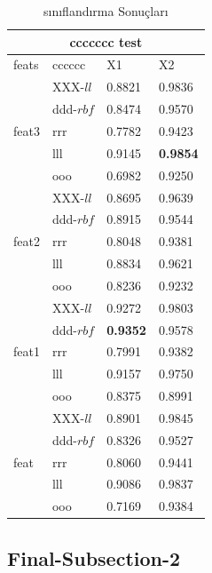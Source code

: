 \begin{table}[hpt]
    \centering
    \caption{sınıflandırma Sonuçları}
    \begin{tabular}{ |p{3cm}||p{3cm}|p{2.5cm}|p{2.5cm}|  }
     \hline
     \multicolumn{4}{|c|}{ ccccccc test} \\
     \hline
     \hline
     feats & cccccc &X1 & X2\\
     \hline
     \hline
     \multirow{5}{4em}{feat3} & XXX-$\textit{ll}$ & 0.8821 &	0.9836 \\ 
         & ddd-$rbf$ & 0.8474 &	0.9570
  \\ 
         & rrr & 0.7782&	0.9423
 \\ 
         & lll & 0.9145	&\textbf{0.9854}
 \\ 
         & ooo & 0.6982&	0.9250
\\
     \hline
     \multirow{5}{4em}{feat2} & XXX-$\textit{ll}$ & 0.8695&	0.9639
\\ 
         & ddd-$rbf$ & 0.8915&	0.9544
 \\ 
         & rrr & 0.8048&	0.9381
\\ 
         & lll & 0.8834&	0.9621
\\ 
         & ooo & 0.8236	&0.9232
\\
     \hline
     \multirow{5}{4em}{feat1} & XXX-$\textit{ll}$ & 0.9272&	0.9803
\\ 
         & ddd-$rbf$ & \textbf{0.9352}&	0.9578
\\ 
         & rrr & 0.7991&	0.9382
\\ 
         & lll & 0.9157&	0.9750
\\ 
         & ooo & 0.8375&	0.8991
\\
     \hline
     \multirow{5}{4em}{feat} & XXX-$\textit{ll}$ & 0.8901&	0.9845
\\ 
         & ddd-$rbf$ & 0.8326&	0.9527
 \\ 
         & rrr & 0.8060&	0.9441
\\ 
         & lll & 0.9086&	0.9837
\\ 
         & ooo & 0.7169&	0.9384
\\
     \hline
    \end{tabular}
    \label{tab:ckgeometrikacc}
\end{table}


\subsection{Final-Subsection-2}

\lipsum[1-2]



